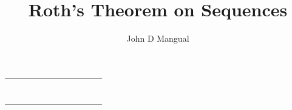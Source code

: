 \documentclass[12pt]{article}
\title{\textbf{ Roth's Theorem on Sequences }}
\author{John D Mangual}
\date{}
\begin{document}
\selectfont \fontsize{25}{30}\selectfont

\maketitle




\newpage

\begin{tabular}{rrrrrrrrrr}
{\color{blue!80!white}{0}} & {\color{red!80!white}{1}} & {\color{red!80!white}{2}} & {\color{red!80!white}{3}} & {\color{blue!80!white}{4}} & {\color{red!80!white}{5}} & {\color{red!80!white}{6}} & {\color{red!80!white}{7}} & {\color{blue!80!white}{8}} & {\color{blue!80!white}{9}}\\ 
{\color{red!80!white}{10}} & {\color{red!80!white}{11}} & {\color{blue!80!white}{12}} & {\color{red!80!white}{13}} & {\color{red!80!white}{14}} & {\color{red!80!white}{15}} & {\color{blue!80!white}{16}} & {\color{red!80!white}{17}} & {\color{blue!80!white}{18}} & {\color{red!80!white}{19}}\\ 
{\color{blue!80!white}{20}} & {\color{red!80!white}{21}} & {\color{red!80!white}{22}} & {\color{red!80!white}{23}} & {\color{blue!80!white}{24}} & {\color{blue!80!white}{25}} & {\color{red!80!white}{26}} & {\color{blue!80!white}{27}} & {\color{blue!80!white}{28}} & {\color{red!80!white}{29}}\\ 
{\color{red!80!white}{30}} & {\color{red!80!white}{31}} & {\color{blue!80!white}{32}} & {\color{red!80!white}{33}} & {\color{red!80!white}{34}} & {\color{red!80!white}{35}} & {\color{blue!80!white}{36}} & {\color{red!80!white}{37}} & {\color{red!80!white}{38}} & {\color{red!80!white}{39}}\\ 
{\color{blue!80!white}{40}} & {\color{red!80!white}{41}} & {\color{red!80!white}{42}} & {\color{red!80!white}{43}} & {\color{blue!80!white}{44}} & {\color{blue!80!white}{45}} & {\color{red!80!white}{46}} & {\color{red!80!white}{47}} & {\color{blue!80!white}{48}} & {\color{blue!80!white}{49}}\\ 
{\color{blue!80!white}{50}} & {\color{red!80!white}{51}} & {\color{blue!80!white}{52}} & {\color{red!80!white}{53}} & {\color{blue!80!white}{54}} & {\color{red!80!white}{55}} & {\color{blue!80!white}{56}} & {\color{red!80!white}{57}} & {\color{red!80!white}{58}} & {\color{red!80!white}{59}}\\ 
{\color{blue!80!white}{60}} & {\color{red!80!white}{61}} & {\color{red!80!white}{62}} & {\color{blue!80!white}{63}} & {\color{blue!80!white}{64}} & {\color{red!80!white}{65}} & {\color{red!80!white}{66}} & {\color{red!80!white}{67}} & {\color{blue!80!white}{68}} & {\color{red!80!white}{69}}\\ 

\end{tabular}
\end{document}
